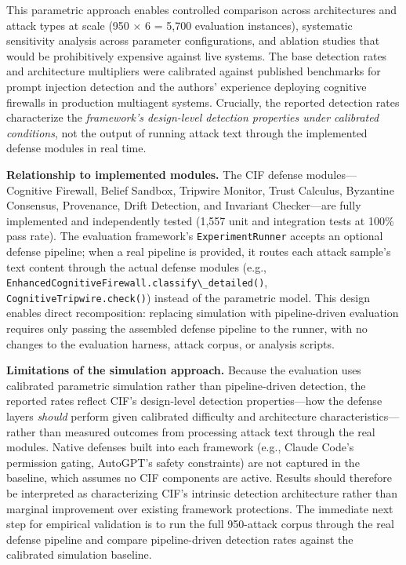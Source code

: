 \documentclass[
]{article}
\begin{document}
This parametric approach enables controlled comparison across
architectures and attack types at scale (950 \(\times\) 6 = 5,700
evaluation instances), systematic sensitivity analysis across parameter
configurations, and ablation studies that would be prohibitively
expensive against live systems. The base detection rates and
architecture multipliers were calibrated against published benchmarks
for prompt injection detection
\cite{greshake2023indirect, liu2023prompt} and the authors' experience
deploying cognitive firewalls in production multiagent systems.
Crucially, the reported detection rates characterize the
\emph{framework's design-level detection properties under calibrated
conditions}, not the output of running attack text through the
implemented defense modules in real time.

\textbf{Relationship to implemented modules.} The CIF defense
modules---Cognitive Firewall, Belief Sandbox, Tripwire Monitor, Trust
Calculus, Byzantine Consensus, Provenance, Drift Detection, and
Invariant Checker---are fully implemented and independently tested
(1,557 unit and integration tests at 100\% pass rate). The evaluation
framework's \texttt{ExperimentRunner} accepts an optional defense
pipeline; when a real pipeline is provided, it routes each attack
sample's text content through the actual defense modules (e.g.,
\texttt{EnhancedCognitiveFirewall.classify\textbackslash{}\_detailed()},
\texttt{CognitiveTripwire.check()}) instead of the parametric model.
This design enables direct recomposition: replacing simulation with
pipeline-driven evaluation requires only passing the assembled defense
pipeline to the runner, with no changes to the evaluation harness,
attack corpus, or analysis scripts.

\textbf{Limitations of the simulation approach.} Because the evaluation
uses calibrated parametric simulation rather than pipeline-driven
detection, the reported rates reflect CIF's design-level detection
properties---how the defense layers \emph{should} perform given
calibrated difficulty and architecture characteristics---rather than
measured outcomes from processing attack text through the real modules.
Native defenses built into each framework (e.g., Claude Code's
permission gating, AutoGPT's safety constraints) are not captured in the
baseline, which assumes no CIF components are active. Results should
therefore be interpreted as characterizing CIF's intrinsic detection
architecture rather than marginal improvement over existing framework
protections. The immediate next step for empirical validation is to run
the full 950-attack corpus through the real defense pipeline and compare
pipeline-driven detection rates against the calibrated simulation
baseline.
\end{document}
